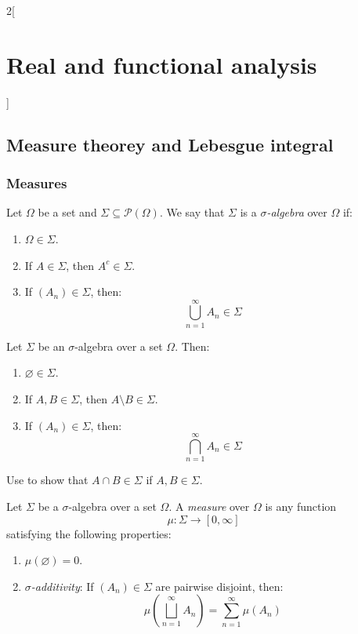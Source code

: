 \documentclass[../../../main_math.tex]{subfiles}
\begin{document}
\begin{multicols}{2}[\section{Real and functional analysis}]
  \subsection{Measure theorey and Lebesgue integral}
  \subsubsection{Measures}
  \begin{definition}
    Let $\Omega$ be a set and $\Sigma\subseteq\mathcal{P}(\Omega)$. We say that $\Sigma$ is a \emph{$\sigma$-algebra} over $\Omega$ if:
    \begin{enumerate}
      \item $\Omega\in\Sigma$.
      \item If $A\in\Sigma$, then $A^c\in\Sigma$.
      \item If $(A_n)\in\Sigma$, then: $$\bigcup_{n=1}^\infty A_n\in\Sigma$$
    \end{enumerate}
  \end{definition}
  \begin{proposition}
    Let $\Sigma$ be an $\sigma$-algebra over a set $\Omega$. Then:
    \begin{enumerate}
      \item $\varnothing\in\Sigma$.
      \item If $A,B\in\Sigma$, then $A\setminus B\in\Sigma$.
      \item If $(A_n)\in\Sigma$, then: $$\bigcap_{n=1}^\infty A_n\in\Sigma$$
    \end{enumerate}
  \end{proposition}
  \begin{sproof}
    Use  to show that $A\cap B\in \Sigma$ if $A,B\in\Sigma$.
  \end{sproof}
  \begin{definition}[Measure]
    Let $\Sigma$ be a $\sigma$-algebra over a set $\Omega$. A \emph{measure} over $\Omega$ is any function $$\mu:\Sigma\longrightarrow[0,\infty]$$ satisfying the following properties:
    \begin{enumerate}[ref = $\sigma$-additivity]
      \item $\mu(\varnothing)=0$.
            \item\label{RFA:sigmaadditivity} \emph{$\sigma$-additivity}: If $(A_n)\in\Sigma$ are pairwise disjoint, then: $$\mu\left(\bigsqcup_{n=1}^\infty A_n\right)=\sum_{n=1}^\infty \mu(A_n)$$

\end{enumerate}
\end{definition}
\end{multicols}
\end{document}
